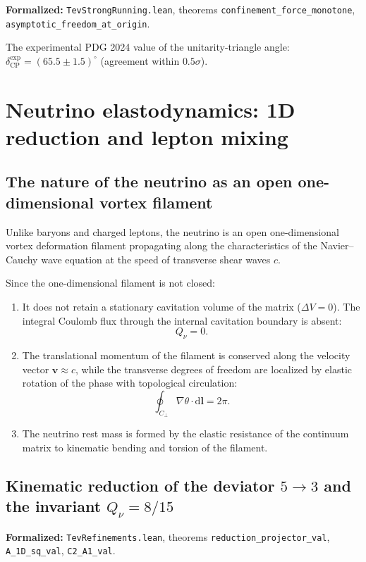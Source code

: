 \documentclass[11pt,a4paper]{article}
\theoremstyle{definition}
\theoremstyle{remark}
\begin{document}
\noindent\small\textbf{Formalized:} \texttt{TevStrongRunning.lean}, theorems \texttt{confinement_force_monotone}, \texttt{asymptotic_freedom_at_origin}.

The experimental PDG 2024 value of the unitarity-triangle angle: $\delta_{\mathrm{CP}}^{\mathrm{exp}} = (65.5 \pm 1.5)^\circ$ (agreement within $0.5\sigma$).

\section{Neutrino elastodynamics: 1D reduction and lepton mixing}
	
\subsection{The nature of the neutrino as an open one-dimensional vortex filament}
	
Unlike baryons and charged leptons, the neutrino is an open one-dimensional vortex deformation filament propagating along the characteristics of the Navier--Cauchy wave equation at the speed of transverse shear waves $c$.
	
Since the one-dimensional filament is not closed:
\begin{enumerate}
\item It does not retain a stationary cavitation volume of the matrix ($\Delta V = 0$). The integral Coulomb flux through the internal cavitation boundary is absent:
\begin{equation}
Q_\nu = 0.
\label{eq:neutrino_charge_neutral_exact}
\end{equation}
\item The translational momentum of the filament is conserved along the velocity vector $\mathbf{v} \approx c$, while the transverse degrees of freedom are localized by elastic rotation of the phase with topological circulation:
\begin{equation}
\oint_{C_\perp} \nabla\theta \cdot \mathrm{d}\mathbf{l} = 2\pi.
\label{eq:neutrino_circulation_quantum}
\end{equation}
\item The neutrino rest mass is formed by the elastic resistance of the continuum matrix to kinematic bending and torsion of the filament.
\end{enumerate}
	
\subsection{Kinematic reduction of the deviator $5 \to 3$ and the invariant $Q_\nu = 8/15$}
\noindent\small\textbf{Formalized:} \texttt{TevRefinements.lean}, theorems \texttt{reduction\_projector\_val}, \texttt{A\_1D\_sq\_val}, \texttt{C2\_A1\_val}.
	
\end{document}
